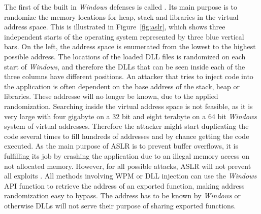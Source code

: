 The first of the built in \emph{Windows} defenses is called  \cite{miller2009method}. Its main purpose is to randomize the memory locations for heap, stack and libraries in the virtual address space. This is illustrated in Figure~\ref{fig:aslr}, which shows three independent starts of the operating system represented by three blue vertical bars. On the left, the address space is enumerated from the lowest to the highest possible address. The locations of the loaded \gls{DLL} files is randomized on each start of \emph{Windows}, and therefore the \glspl{DLL} that can be seen inside each of the three columns have different positions. An attacker that tries to inject code into the application is often dependent on the base address of the stack, heap or libraries. These addresse will no longer be known, due to the applied randomization. Searching inside the virtual address space is not feasible, as it is very large with four gigabyte on a 32 bit and eight terabyte on a 64 bit \emph{Windows} system of virtual addresses. Therefore the attacker might start duplicating the code several times to fill hundreds of addresses and by chance getting the code executed. As the main purpose of \gls{ASLR} is to prevent buffer overflows, it is fulfilling its job by crashing the application due to an illegal memory access on not allocated memory. However, for all possible attacks, \gls{ASLR} will not prevent all exploits \cite{shacham}. All methods involving \gls{WPM} or \gls{DLL} injection can use the \emph{Windows} \gls{API} function  to retrieve the address of an exported function, making address randomization easy to bypass. The address has to be known by \emph{Windows} or otherwise \glspl{DLL} will not serve their purpose of sharing exported functions.